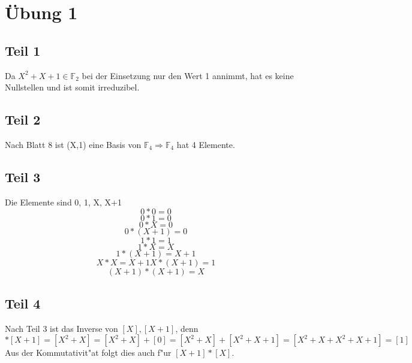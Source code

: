 \documentclass[10pt,a4paper]{article}
\begin{document}
\section*{Übung 1}

\subsection*{Teil 1}

Da $X^2+X+1 \in \mathbb{F}_{2}$ bei der Einsetzung nur den Wert 1 annimmt, hat es keine Nullstellen und ist somit irreduzibel.

\subsection*{Teil 2}

Nach Blatt 8 ist (X,1) eine Basis von $\mathbb{F}_4 
\Rightarrow \mathbb{F}_4$ hat 4 Elemente.

\subsection*{Teil 3}

Die Elemente sind {0, 1, X, X+1}
\begin{equation}
0*0=0
\end{equation}
\begin{equation}
0*1=0
\end{equation}
\begin{equation}
0*X=0
\end{equation}
\begin{equation}
0*(X+1)=0
\end{equation}
\begin{equation}
1*1=1
\end{equation}
\begin{equation}
1*X=X
\end{equation}
\begin{equation}
1*(X+1)=X+1
\end{equation}
\begin{equation}X*X=X+1
X*(X+1)=1
\end{equation}
\begin{equation}
(X+1)*(X+1)=X
\end{equation}

\subsection*{Teil 4}

Nach Teil 3 ist das Inverse von $[X], [X+1]$, denn 
\begin{equation}
[X]*[X+1]=[X^2+X]=[X^2+X]+[0]=[X^2+X]+[X^2+X+1]=[X^2+X+X^2+X+1]=[1]
\end{equation}
Aus der Kommutativit"at folgt dies auch f"ur $[X+1]*[X]$.
\end{document}
